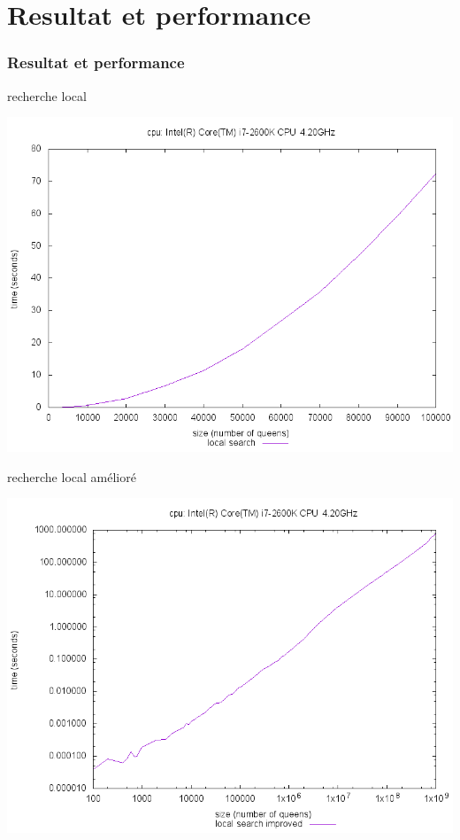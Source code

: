 \documentclass[10pt,a4paper]{beamer}
\begin{document}
\section{Resultat et performance}
\begin{frame}
	\frametitle{Resultat et performance}

	\begin{block}{recherche local}

	\includegraphics[width=1\textwidth]{images/plot_ls_i7.png}

	\end{block}

	\begin{block}{recherche local amélioré}

	\includegraphics[width=1\textwidth]{images/plot_lst_i7.png}


\end{block}
\end{frame}
\end{document}
